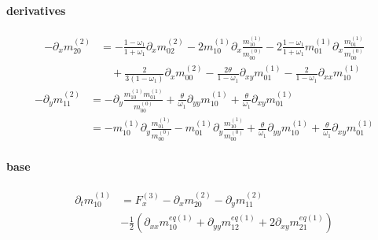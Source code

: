 \documentclass{article}
\begin{document}
  \paragraph{derivatives}
  \begin{equation}
    \tag{C5}
    \begin{aligned}
      - \partial_x m_{20}^{(2)} &=
      - \frac{1-\omega_1}{1+\omega_1} \partial_x m_{02}^{(2)}
      - 2 m_{10}^{(1)} \partial_x \frac{ m_{10}^{(1)} }{m_{00}^{(0)}}
      - 2 \frac{1-\omega_1}{1+\omega_1} m_{01}^{(1)}\partial_x\frac{m_{01}^{(1)}}{m_{00}^{(0)}}
      \\&\quad
      + \frac{ 2}{3(1-\omega_1)} \partial_x m_{00}^{(2)}
      - \frac{2\theta}{1-\omega_1}\partial_{xy} m_{01}^{(1)}
      - \frac{2}{1-\omega_1}\partial_{xx} m_{10}^{(1)}
    \end{aligned}
  \end{equation}
  \begin{equation}
    \tag{C6}
    \begin{aligned}
    -\partial_y m_{11}^{(2)} &=  -\partial_y \frac{ m_{10}^{(1)}m_{01}^{(1)}}{m_{00}^{(0)}}
    + \frac{\theta}{\omega_1}\partial_{yy} m_{10}^{(1)} + \frac{\theta}{\omega_1}\partial_{xy} m_{01}^{(1)}
    \\&=
    -m_{10}^{(1)}\partial_y \frac{ m_{01}^{(1)}}{m_{00}^{(0)}}-m_{01}^{(1)}\partial_y \frac{ m_{10}^{(1)}}{m_{00}^{(0)}}
  + \frac{\theta}{\omega_1}\partial_{yy} m_{10}^{(1)} + \frac{\theta}{\omega_1}\partial_{xy} m_{01}^{(1)}
    \end{aligned}
  \end{equation}

  \pagebreak
  \paragraph{base}
  \begin{equation*}
    \begin{aligned}
    \partial_t m_{10}^{(1)}
     & =
      F_x^{(3)}
      - \partial_x m_{20}^{(2)} - \partial_y m_{11}^{(2)} \\
      &
      - \frac{1}{2} \left(\partial_{xx} m_{10}^{eq(1)} + \partial_{yy} m_{12}^{eq(1)} + 2\partial_{xy} m_{21}^{eq(1)}\right)
    \end{aligned}
  \end{equation*}

\end{document}

